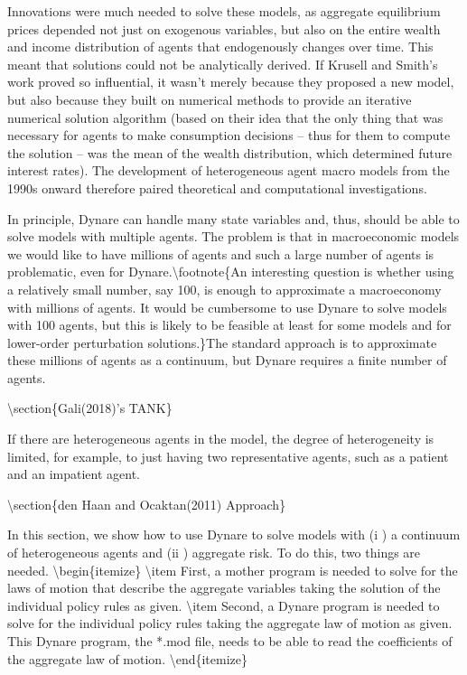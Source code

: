 \documentclass[10pt,math=newtx,citestyle=gb7714-2015,bibstyle=gb7714-2015]{elegantbook}
\begin{document}
	Innovations were much needed to solve these models, as aggregate equilibrium prices depended not just on exogenous variables, but also on the entire wealth and income distribution of agents that endogenously changes over time. This meant that solutions could not be analytically derived. If Krusell and Smith’s work proved so influential, it wasn’t merely because they proposed a new model, but also because they built on numerical methods to provide an iterative numerical solution algorithm (based on their idea that the only thing that was necessary for agents to make consumption decisions – thus for them to compute the solution – was the mean of the wealth distribution, which determined future interest rates). The development of heterogeneous agent macro models from the 1990s onward therefore paired theoretical and computational investigations.
	
	In principle, Dynare can handle many state variables and, thus, should be able to solve models with multiple agents. The problem is that in macroeconomic models we would like to have millions of agents and such a large number of agents is problematic, even for Dynare.\textbackslash{}footnote\{An interesting question is whether using a relatively small number, say 100, is enough to approximate a macroeconomy with millions of agents. It would be cumbersome to use Dynare to solve models with 100 agents, but this is likely to be feasible at least for some models and for lower-order perturbation solutions.\}The standard approach is to approximate these millions of agents as a continuum, but Dynare requires a finite number of agents.
	
	\textbackslash{}section\{Gali(2018)'s TANK\}
	
	If there are heterogeneous agents in the model, the degree of heterogeneity is limited, for example, to just having two representative agents, such as a patient and an impatient agent.
	
	
	\textbackslash{}section\{den Haan and Ocaktan(2011) Approach\}
	
	In this section, we show how to use Dynare to solve models with (i ) a continuum of heterogeneous agents and (ii ) aggregate risk. To do this, two things are needed.
	\textbackslash{}begin\{itemize\}
	\textbackslash{}item First, a mother program is needed to solve for the laws of motion that describe the aggregate variables taking the solution of the individual policy rules as given.
	\textbackslash{}item Second, a Dynare program is needed to solve for the individual policy rules taking the aggregate law of motion as given. This Dynare program, the *.mod file, needs to be able to read the coefficients of the aggregate law of motion.
	\textbackslash{}end\{itemize\}
	
\end{document}
